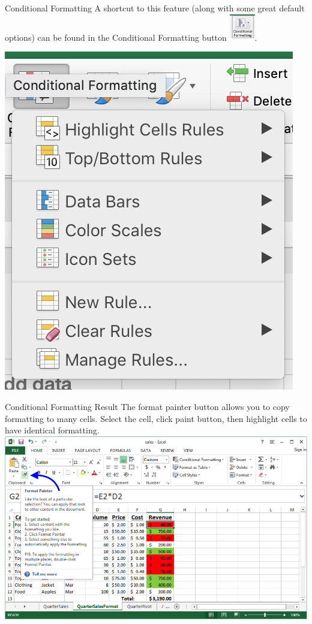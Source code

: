 \documentclass[xcolor=svgnames]{beamer}
\begin{document}
\begin{frame}{Conditional Formatting}
A shortcut to this feature (along with some great default options) can be found in the Conditional Formatting button  \includegraphics[width=3em]{CFbutton}.

\begin{center}
\includegraphics[height=0.4\textheight]{CFoptions}
\end{center}


\end{frame}

\begin{frame}{Conditional Formatting Result}
The format painter button allows you to copy formatting to many cells.  Select the cell, click paint button, then highlight cells to have identical formatting.
\hspace*{-6mm}                                                           
 \includegraphics[width=1.1\textwidth]{FormatPainter}
\end{frame}
\end{document}

